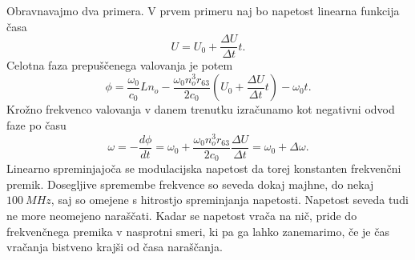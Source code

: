 Obravnavajmo dva primera. V prvem primeru naj bo 
napetost linearna funkcija časa 
\begin{equation}
U= U_0 + \frac{\Delta U}{\Delta t}t.
\end{equation}
Celotna faza prepuščenega valovanja je potem
\begin{equation}
\phi = \frac{\omega_0}{c_0}L n_o - \frac{\omega_0 n_o^3 r_{63}}{2c_0}\left( U_0 + 
\frac{\Delta U}{\Delta t}t\right) - \omega_0 t.
\end{equation}
Krožno frekvenco valovanja v danem trenutku izračunamo kot negativni odvod faze po času
\begin{equation}
\omega = -\frac{d\phi}{dt} = \omega_0 + \frac{\omega_0 n_o^3 r_{63}}{2c_0}\frac{\Delta U}{\Delta t} =
\omega_0 + \Delta \omega.
\end{equation}
Linearno spreminjajoča se modulacijska napetost da torej konstanten frekvenčni premik. 
Dosegljive spremembe frekvence so seveda dokaj majhne,
do nekaj $100~\si{MHz}$, saj so omejene s hitrostjo spreminjanja napetosti.
Napetost seveda tudi ne more neomejeno naraščati. Kadar se napetost
vrača na nič, pride do frekvenčnega premika v nasprotni smeri, ki pa ga
lahko zanemarimo, če je čas vračanja bistveno krajši od časa naraščanja.

